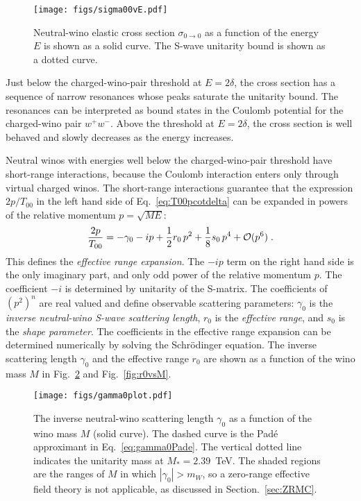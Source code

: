 \documentclass[%
 reprint,
 amsmath,amssymb,
 aps,
]{revtex4-1}
\begin{document}
\begin{figure}[t]
\centering
\texttt{[image: figs/sigma00vE.pdf]}
\caption{Neutral-wino elastic cross section $\sigma_{0 \to 0}$  as a function of the energy $E$ is shown as a solid curve. 
The S-wave unitarity bound is shown as a dotted curve.}
\label{fig:sigma00-NREFT}
\end{figure}

Just below the charged-wino-pair threshold at $E= 2\delta$, the cross section has a sequence of narrow resonances whose peaks saturate the unitarity bound. The resonances can be interpreted as bound states in the Coulomb potential for the charged-wino pair $w^+w^-$. Above the threshold at $E= 2\delta$, the cross section is well behaved and slowly decreases as the energy increases.

Neutral winos with energies well below the charged-wino-pair threshold have short-range interactions, because the Coulomb interaction enters only through virtual charged winos. The short-range interactions guarantee that the expression $2p/T_{00}$ in the left hand side of Eq.~\eqref{eq:T00pcotdelta} can be expanded in powers of the relative momentum $p = \sqrt{ME}$:
\begin{equation}
\frac{2p}{T_{00}} = -\gamma_0 -ip + \frac12 r_0\,p^2 + \frac18 s_0\,p^4 + {\cal O}(p^6) \;.
\label{eq:T00NRinv}
\end{equation}
This defines the {\it effective range expansion}.
The $-ip$ term on the right hand side is the only imaginary part, and only odd power of the relative momentum $p$.
The coefficient $-i$ is determined by unitarity of the S-matrix.
The coefficients of ${(p^2)}^n$ are real valued and define observable scattering parameters: $\gamma_0$ is the {\it inverse neutral-wino S-wave scattering length}, $r_0$ is the {\it effective range}, and $s_0$ is the {\it shape parameter}.
The coefficients in the effective range expansion can be determined numerically by solving the Schr\"odinger equation.
The inverse scattering length $\gamma_0$ and the effective range $r_0$ are shown as a function of the wino mass $M$ in Fig.~\ref{fig:gamma0_vsM} and Fig.~\ref{fig:r0vsM}.

\begin{figure}[t]
\centering
\texttt{[image: figs/gamma0plot.pdf]}
\caption{The inverse neutral-wino scattering length $\gamma_0$ as a function of the wino mass $M$ (solid curve). 
The dashed curve is the Pad\'e approximant in Eq.~\eqref{eq:gamma0Pade}.
The vertical dotted line indicates the unitarity mass at $M_* = 2.39$~TeV. 
The shaded regions are the ranges of $M$ in which $|\gamma_0| > m_W$, so a zero-range effective field theory is not applicable, as discussed in Section.~\ref{sec:ZRMC}.
}
\label{fig:gamma0_vsM}
\end{figure}
\end{document}
